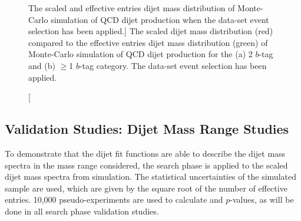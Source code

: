 \begin{figure}[!ht]
  \begin{center}
    \captionsetup[subfigure]{aboveskip=0pt,justification=centering}
  \end{center}
  \caption
      [The scaled and effective entries dijet mass distribution
        of Monte-Carlo simulation of QCD dijet production when the \summer{} data-set event selection has been applied.]
      {The scaled dijet mass distribution (red) compared to the
        effective entries dijet mass distribution (green)
        of Monte-Carlo simulation of QCD dijet production for the (a) 2 $b$-tag and (b) $\geq$1 $b$-tag category.
        The \summer{} data-set event selection has been applied.}
  \label{fig:effEnt}
\end{figure}

\subsection{Validation Studies: Dijet Mass Range Studies}
\label{sec:bkg-summer_range}

To demonstrate that the dijet fit functions are able to describe the dijet mass spectra in the mass range considered,
the search phase is applied to the scaled dijet mass spectra from simulation.
The statistical uncertainties of the simulated sample are used,
which are given by the square root of the number of effective entries.
10,000 pseudo-experiments are used to calculate \bh{} and \dhunt{} $p$-values, as will be done in all \summer{} search phase validation studies.


